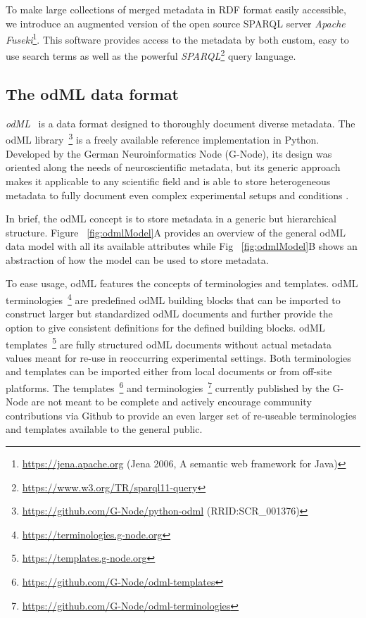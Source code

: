 \documentclass{article}
\begin{document}
To make large collections of merged metadata in RDF format easily accessible, we introduce an augmented version of the open source SPARQL server \textit{Apache Fuseki}\footnote{\url{https://jena.apache.org} (Jena 2006, A semantic web framework for Java)}. This software provides access to the metadata by both custom, easy to use search terms as well as the powerful
\textit{SPARQL}\footnote{\url{https://www.w3.org/TR/sparql11-query}} query language.


\subsection{The odML data format} \label{sec:odml_intro}
\textit{odML}~\cite{Grewe_2011} is a data format designed to thoroughly document diverse metadata. The odML library~\footnote{\url{https://github.com/G-Node/python-odml} (RRID:SCR\_001376)} is a freely available reference implementation in Python. Developed by the German Neuroinformatics Node (G-Node), its design was oriented along the needs of neuroscientific metadata, but its generic approach makes it applicable to any scientific field and is able to store heterogeneous metadata to fully document even complex experimental setups and conditions \cite{Zehl_2016}.

In brief, the odML concept is to store metadata in a generic but hierarchical structure. Figure ~\ref{fig:odmlModel}A provides an overview of the general odML data model with all its available attributes while Fig ~\ref{fig:odmlModel}B shows an abstraction of how the model can be used to store metadata.

To ease usage, odML features the concepts of terminologies and templates. odML terminologies~\footnote{\url{https://terminologies.g-node.org}} are predefined odML building blocks that can be imported to construct larger but standardized odML documents and further provide the option to give consistent definitions for the defined building blocks. odML templates~\footnote{\url{https://templates.g-node.org}} are fully structured odML documents without actual metadata values meant for re-use in reoccurring experimental settings. Both terminologies and templates can be imported either from local documents or from off-site platforms. The templates~\footnote{\url{https://github.com/G-Node/odml-templates}} and terminologies~\footnote{\url{https://github.com/G-Node/odml-terminologies}} currently published by the G-Node are not meant to be complete and actively encourage community contributions via Github to provide an even larger set of re-useable terminologies and templates available to the general public.
\end{document}
